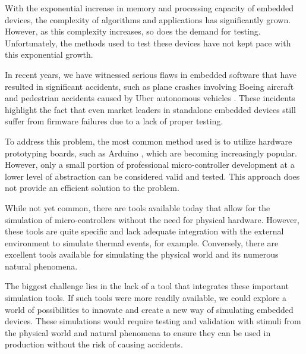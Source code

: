 \documentclass[../../monografia.tex]{subfiles}
\begin{document}
With the exponential increase in memory and processing capacity of embedded devices, the complexity of algorithms and applications has significantly grown. However, as this complexity increases, so does the demand for testing. Unfortunately, the methods used to test these devices have not kept pace with this exponential growth.

In recent years, we have witnessed serious flaws in embedded software that have resulted in significant accidents, such as plane crashes involving Boeing aircraft \cite{acidente_boing_23} and pedestrian accidents caused by Uber autonomous vehicles \cite{acidente_uber_23}. These incidents highlight the fact that even market leaders in standalone embedded devices still suffer from firmware failures due to a lack of proper testing.

To address this problem, the most common method used is to utilize hardware prototyping boards, such as Arduino \cite{Arduino_23}, which are becoming increasingly popular. However, only a small portion of professional micro-controller development at a lower level of abstraction can be considered valid and tested. This approach does not provide an efficient solution to the problem.

While not yet common, there are tools available today that allow for the simulation of micro-controllers without the need for physical hardware. However, these tools are quite specific and lack adequate integration with the external environment to simulate thermal events, for example. Conversely, there are excellent tools available for simulating the physical world and its numerous natural phenomena.

The biggest challenge lies in the lack of a tool that integrates these important simulation tools. If such tools were more readily available, we could explore a world of possibilities to innovate and create a new way of simulating embedded devices. These simulations would require testing and validation with stimuli from the physical world and natural phenomena to ensure they can be used in production without the risk of causing accidents.
\end{document}

